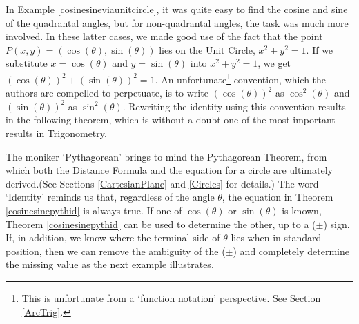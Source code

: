 \medskip



In Example \ref{cosinesineviaunitcircle},  it was quite easy to find the cosine and sine of the quadrantal angles, but for non-quadrantal angles, the task was much more involved.   In these latter cases, we made good use of the fact that the point $P(x,y) = (\cos(\theta), \sin(\theta))$ lies on the Unit Circle, $x^2+y^2 = 1$.  If we substitute  $x=\cos(\theta)$ and $y = \sin(\theta)$ into $x^2+y^2=1$, we get  $\left(\cos(\theta)\right)^2 + \left(\sin(\theta)\right)^2 = 1$.  An unfortunate\footnote{This is unfortunate from a `function notation' perspective. See Section \ref{ArcTrig}.} convention, which the authors are compelled to perpetuate,  is to write $\left(\cos(\theta)\right)^2$ as $\cos^{2}(\theta)$ and $\left(\sin(\theta)\right)^2$ as $\sin^{2}(\theta)$. Rewriting the identity using this convention results in the following theorem, which is without a doubt one of the most important results in Trigonometry.

\smallskip


\smallskip

The moniker `Pythagorean' brings to mind the Pythagorean Theorem, from which both the Distance Formula and the equation for a circle are ultimately derived.(See Sections \ref{CartesianPlane} and \ref{Circles} for details.)  The word `Identity' reminds us that, regardless of the angle $\theta$, the equation in Theorem \ref{cosinesinepythid} is always true.  If one of $\cos(\theta)$ or $\sin(\theta)$ is known, Theorem \ref{cosinesinepythid} can be used to determine the other, up to a ($\pm$) sign.  If, in addition, we know where the terminal side of $\theta$ lies when in standard position, then we can remove the ambiguity of the ($\pm$) and completely determine the missing value as the next example illustrates.

\medskip

